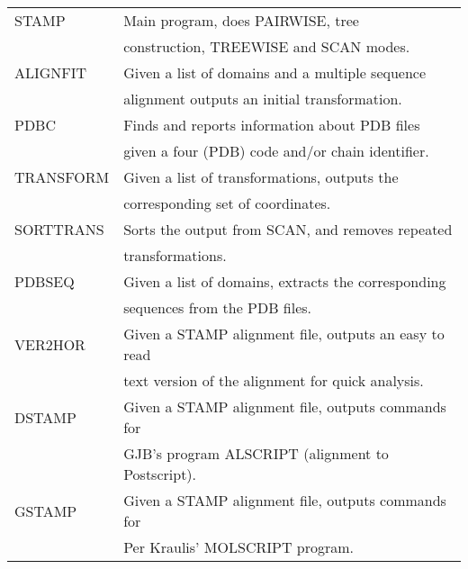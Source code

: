 \begin{center}
    \begin{tabular}{|ll|}
        \hline
        STAMP   &   Main program, does PAIRWISE, tree \\
        &   construction, TREEWISE and SCAN modes.\\
        \hline
        ALIGNFIT &   Given a list of domains and a multiple sequence \\   
        &      alignment outputs an initial transformation.\\
        \hline
        PDBC    &    Finds and reports information about PDB files\\
        &     given a four (PDB) code and/or chain identifier.\\ 
        \hline
        TRANSFORM  & Given a list of transformations, outputs the\\ 
        & corresponding set of coordinates.\\
        \hline
        SORTTRANS & Sorts the output from SCAN, and removes repeated \\ 
        &   transformations. \\
        \hline
        PDBSEQ   & Given a list of domains, extracts the corresponding \\
        &    sequences from the PDB files.\\
        \hline
        VER2HOR  & Given a STAMP alignment file, outputs an easy to read\\
        &    text version of the alignment for quick analysis.\\
        \hline
        DSTAMP   & Given a STAMP alignment file, outputs commands for\\
        &    GJB's program ALSCRIPT (alignment to Postscript).\\
        \hline
        GSTAMP   & Given a STAMP alignment file, outputs commands for\\
        &    Per Kraulis' MOLSCRIPT program.\\
        \hline
    \end{tabular}
\end{center}

